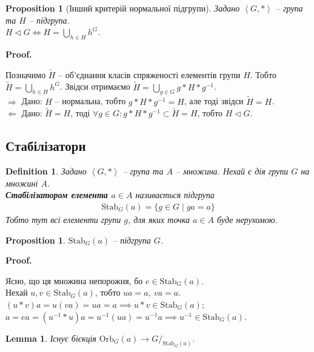 \documentclass[a4paper, 10pt]{article}
\makeatletter
\def\rightproof{$\boxed{\Rightarrow}$ }
\def\leftproof{$\boxed{\Leftarrow}$ }
\theoremstyle{theoremdd}
\theoremstyle{theoremdd}
\newtheorem{definition}[theorem]{Definition}
\theoremstyle{theoremdd}
\theoremstyle{theoremdd}
\theoremstyle{theoremdd}
\theoremstyle{theoremdd}
\theoremstyle{theoremdd}
\theoremstyle{theoremdd}
\theoremstyle{theoremdd}
\newtheorem{proposition}[theorem]{Proposition}
\theoremstyle{theoremdd}
\theoremstyle{theoremdd}
\theoremstyle{theoremdd}
\theoremstyle{theoremdd}
\newtheorem{lemma}[theorem]{Lemma}
\theoremstyle{theoremdd}
\theoremstyle{theoremdd}
\renewenvironment{proof}[1][Proof.\\]{\par
\pushQED{\hfill \qed}%
\normalfont \topsep6\p@\@plus6\p@\relax
\trivlist
\item\relax
{\bfseries
#1\@addpunct{.}}\hspace\labelsep\ignorespaces
}{%
\popQED\endtrivlist\@endpefalse
}
\newcommand\Orb{\text{Orb}}
\newcommand\Stab{\text{Stab}}
\makeatother
\begin{document}
\begin{proposition}[Інший критерій нормальної підгрупи]
Задано $\left< G,* \right>$ -- група та $H$ -- підгрупа.\\
$H \triangleleft G \iff H = \displaystyle\bigcup_{h \in H} h^G$.
\end{proposition}

\begin{proof}
Позначимо $\tilde{H}$ -- об'єднання класів спряженості елементів групи $H$. Тобто $\tilde{H} = \displaystyle\bigcup_{h \in H} h^G$. Звідси отримаємо $\tilde{H} = \displaystyle\bigcup_{g \in G} g*H*g^{-1}$.\\
\rightproof Дано: $H$ -- нормальна, тобто $g*H*g^{-1} = H$, але тоді звідси $\tilde{H} = H$.\\
\leftproof Дано: $\tilde{H} = H$, тоді $\forall g \in G: g*H*g^{-1} \subset \tilde{H} = H$, тобто $H \triangleleft G$.
\end{proof}

\subsection{Стабілізатори}
\begin{definition}
Задано $\left< G,* \right>$ -- група та $A$ -- множина. Нехай є дія групи $G$ на множині $A$.\\
\textbf{Стабілізатором елемента $a \in A$} називається підгрупа
\begin{align*}
\Stab_G(a) = \{g \in G \mid ga = a\}
\end{align*}
Тобто тут всі елементи групи $g$, для яких точка $a \in A$ буде нерухомою.
\end{definition}

\begin{proposition}
$\Stab_G(a)$ -- підгрупа $G$.
\end{proposition}

\begin{proof}
Ясно, що ця множина непорожня, бо $e \in \Stab_G(a)$.\\
Нехай $u,v \in \Stab_G(a)$, тобто $ua = a,\ va = a$.\\
$(u*v)a = u(va) = ua = a \implies u*v \in \Stab_G(a)$;\\
$a = ea = (u^{-1}*u)a = u^{-1}(ua) = u^{-1}a \implies u^{-1} \in \Stab_G(a)$.
\end{proof}

\begin{lemma}
Існує бієкція $\Orb_G(a) \to G/_{\Stab_G(a)}$.
\end{lemma}
\end{document}
